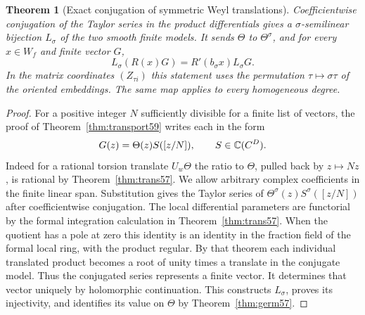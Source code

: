 \documentclass[a4paper,11pt]{article}
\newtheorem{theorem}[proposition]{Theorem}
\theoremstyle{definition}
\theoremstyle{remark}
\numberwithin{equation}{section}
\begin{document}
\begin{theorem}[Exact conjugation of symmetric Weyl translations]
\leavevmode\label{thm:weyltransport864}
Coefficientwise conjugation of the Taylor series in the product
differentials gives a \(\sigma\)-semilinear bijection \(L_\sigma\)
of the two smooth finite models. It sends \(\Theta\) to
\(\Theta^\sigma\), and for every \(x\in W_f\) and finite vector \(G\),
\begin{equation}
              L_\sigma(R(x)G)=R'(b_\sigma x)L_\sigma G.
 \label{eq:weyltransport864}
\end{equation}
In the matrix coordinates \((Z_{\tau i})\) this statement uses
the permutation \(\tau\mapsto\sigma\tau\) of the oriented
embeddings. The same map applies to every homogeneous degree.
\end{theorem}
\begin{proof}
For a positive integer \(N\) sufficiently divisible for a finite
list of vectors, the proof of Theorem~\ref{thm:transport59}
writes each in the form
\[
                  G(z)=\Theta(z)S([z/N]),\qquad S\in\mathbb C(C^D).
\]
Indeed for a rational torsion translate \(U_w\Theta\) the ratio
to \(\Theta\), pulled back by \(z\mapsto Nz\), is rational by
Theorem~\ref{thm:trans57}. We allow arbitrary complex coefficients
in the finite linear span. Substitution gives the Taylor series
of \(\Theta^\sigma(z)S^\sigma([z/N])\) after coefficientwise
conjugation. The local differential parameters are functorial by
the formal integration calculation in Theorem~\ref{thm:trans57}.
When the quotient has a pole at zero this identity is an identity
in the fraction field of the formal local ring, with the product
regular. By that theorem each individual translated product
becomes a root of unity times a translate in the conjugate
model. Thus the conjugated series represents a finite vector.
It determines that vector uniquely by holomorphic continuation.
This constructs \(L_\sigma\), proves its injectivity, and
identifies its value on \(\Theta\) by Theorem~\ref{thm:germ57}.


\end{proof}
\end{document}

